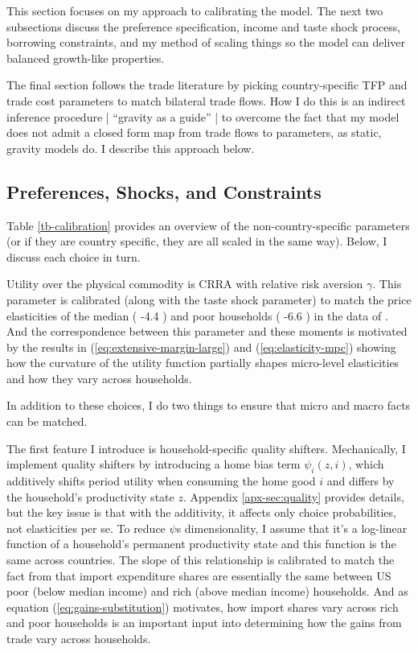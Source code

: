 \documentclass[12pt,pdftex]{article}
\begin{document}
\begin{onehalfspacing}
This section focuses on my approach to calibrating the model. The next two subsections discuss the preference specification, income and taste shock process, borrowing constraints, and my method of scaling things so the model can deliver balanced growth-like properties.

The final section follows the trade literature by picking country-specific TFP and trade cost parameters to match bilateral trade flows. How I do this is an indirect inference procedure | ``gravity as a guide'' | to overcome the fact that my model does not admit a closed form map from trade flows to parameters, as static, gravity models do. I describe this approach below.

\subsection{Preferences, Shocks, and Constraints}

Table \ref{tb-calibration} provides an overview of the non-country-specific parameters (or if they are country specific, they are all scaled in the same way). Below, I discuss each choice in turn.

Utility over the physical commodity is CRRA with relative risk aversion $\gamma$. This parameter is calibrated (along with the taste shock parameter) to match the price elasticities of the median ( -4.4 ) and poor households ( -6.6 )  in the data of \citet{auer2022unequal}. And the correspondence between this parameter and these moments is motivated by the results in (\ref{eq:extensive-margin-large}) and (\ref{eq:elasticity-mpc}) showing how the curvature of the utility function partially shapes micro-level elasticities and how they vary across households.

In addition to these choices, I do two things to ensure that micro and macro facts can be matched.

The first feature I introduce is household-specific quality shifters. Mechanically, I implement quality shifters by introducing a home bias term $\psi_{i}(z,i)$, which additively shifts period utility when consuming the home good $i$ and differs by the household's productivity state $z$. Appendix \ref{apx-sec:quality} provides details, but the key issue is that with the additivity, it affects only choice probabilities, not elasticities per se. To reduce $\psi$s dimensionality, I assume that it's a log-linear function of a household's permanent productivity state and this function is the same across countries. The slope of this relationship is calibrated to match the fact from \citet{borusyak2021distributional} that import expenditure shares are essentially the same between US poor (below median income) and rich (above median income) households. And as equation (\ref{eq:gains-substitution}) motivates, how import shares vary across rich and poor households is an important input into determining how the gains from trade vary across households.


\end{onehalfspacing}
\end{document}
